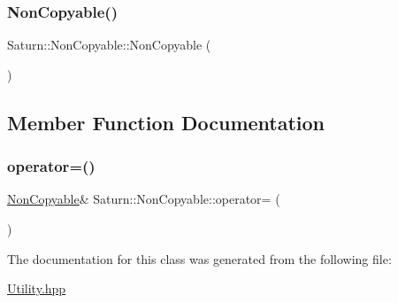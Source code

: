 \mbox{\label{class_saturn_1_1_non_copyable_aeddf6ec26a7dc9943513a8d8a4d587e6}} 
\subsubsection{\texorpdfstring{Non\+Copyable()}{NonCopyable()}\hspace{0.1cm}{\footnotesize\ttfamily [2/2]}}
{\footnotesize\ttfamily Saturn\+::\+Non\+Copyable\+::\+Non\+Copyable (\begin{DoxyParamCaption}\item[{\mbox{\hyperlink{class_saturn_1_1_non_copyable}{Non\+Copyable}} const \&}]{ }\end{DoxyParamCaption})\hspace{0.3cm}{\ttfamily [delete]}}



\subsection{Member Function Documentation}
\mbox{\label{class_saturn_1_1_non_copyable_ada58c0a0bab59bc988a493ec5ecae0d3}} 
\subsubsection{\texorpdfstring{operator=()}{operator=()}}
{\footnotesize\ttfamily \mbox{\hyperlink{class_saturn_1_1_non_copyable}{Non\+Copyable}}\& Saturn\+::\+Non\+Copyable\+::operator= (\begin{DoxyParamCaption}\item[{\mbox{\hyperlink{class_saturn_1_1_non_copyable}{Non\+Copyable}} const \&}]{ }\end{DoxyParamCaption})\hspace{0.3cm}{\ttfamily [delete]}}



The documentation for this class was generated from the following file\+:\begin{DoxyCompactItemize}
\item 
\mbox{\hyperlink{_utility_8hpp}{Utility.\+hpp}}\end{DoxyCompactItemize}

